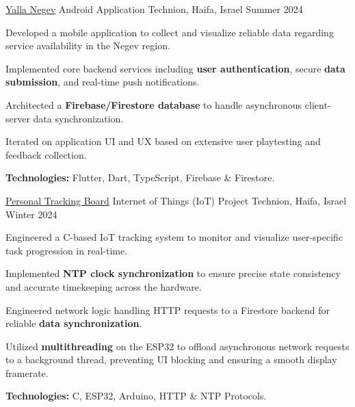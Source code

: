 
\begin{cventries}

  \cventry
    {\href{https://github.com/WizardCell/Yalla-Negev}{\underline{Yalla Negev}}} %
    {Android Application} %
    {Technion, Haifa, Israel} %
    {Summer 2024} %
    {
      \begin{cvitems} %
        \item {Developed a mobile application to collect and visualize reliable data regarding service availability in the Negev region.}
        \item {Implemented core backend services including \textbf{user authentication}, secure \textbf{data submission}, and real-time push notifications.}
        \item {Architected a \textbf{Firebase/Firestore database} to handle asynchronous client-server data synchronization.}
        \item {Iterated on application UI and UX based on extensive user playtesting and feedback collection.}
        \item {\textbf{Technologies:} Flutter, Dart, TypeScript, Firebase \& Firestore.}
      \end{cvitems}
    }

  \cventry
    {\href{https://github.com/WizardCell/Personal-Tracking-Board}{\underline{Personal Tracking Board}}} %
    {Internet of Things (IoT) Project} %
    {Technion, Haifa, Israel} %
    {Winter 2024} %
    {
      \begin{cvitems} %
        \item {Engineered a C-based IoT tracking system to monitor and visualize user-specific task progression in real-time.}
        \item {Implemented \textbf{NTP clock synchronization} to ensure precise state consistency and accurate timekeeping across the hardware.}
        \item {Engineered network logic handling HTTP requests to a Firestore backend for reliable \textbf{data synchronization}.}
        \item {Utilized \textbf{multithreading} on the ESP32 to offload asynchronous network requests to a background thread, preventing UI blocking and ensuring a smooth display framerate.}
        \item {\textbf{Technologies:} C, ESP32, Arduino, HTTP \& NTP Protocols.}
      \end{cvitems}
    }

\end{cventries}